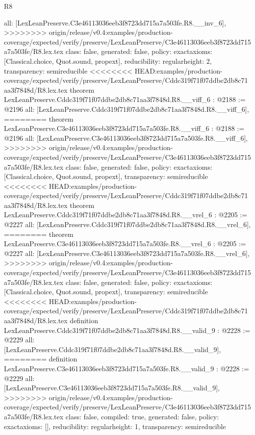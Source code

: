 \begin{lexlean}{R8}
\begin{coremodule}
{{{{{{{{{{{{  all: [LexLeanPreserve.C3e46113036eeb3f8723dd715a7a503fe.R8.__inv_6],
>>>>>>>> origin/release/v0.4:examples/production-coverage/expected/verify/preserve/LexLeanPreserve/C3e46113036eeb3f8723dd715a7a503fe/R8.lex.tex
  class: false,
  generated: false,
  policy: exact{axioms: [Classical.choice, Quot.sound, propext]},
  reducibility: regular{height: 2},
  transparency: semireducible
}
<<<<<<<< HEAD:examples/production-coverage/expected/verify/preserve/LexLeanPreserve/Cddc319f71f07ddbe2db8c71aa3f7848d/R8.lex.tex
theorem LexLeanPreserve.Cddc319f71f07ddbe2db8c71aa3f7848d.R8.__viff_6 : @2188 := @2196 {
  all: [LexLeanPreserve.Cddc319f71f07ddbe2db8c71aa3f7848d.R8.__viff_6],
========
theorem LexLeanPreserve.C3e46113036eeb3f8723dd715a7a503fe.R8.__viff_6 : @2188 := @2196 {
  all: [LexLeanPreserve.C3e46113036eeb3f8723dd715a7a503fe.R8.__viff_6],
>>>>>>>> origin/release/v0.4:examples/production-coverage/expected/verify/preserve/LexLeanPreserve/C3e46113036eeb3f8723dd715a7a503fe/R8.lex.tex
  class: false,
  generated: false,
  policy: exact{axioms: [Classical.choice, Quot.sound, propext]},
  transparency: semireducible
}
<<<<<<<< HEAD:examples/production-coverage/expected/verify/preserve/LexLeanPreserve/Cddc319f71f07ddbe2db8c71aa3f7848d/R8.lex.tex
theorem LexLeanPreserve.Cddc319f71f07ddbe2db8c71aa3f7848d.R8.__vrel_6 : @2205 := @2227 {
  all: [LexLeanPreserve.Cddc319f71f07ddbe2db8c71aa3f7848d.R8.__vrel_6],
========
theorem LexLeanPreserve.C3e46113036eeb3f8723dd715a7a503fe.R8.__vrel_6 : @2205 := @2227 {
  all: [LexLeanPreserve.C3e46113036eeb3f8723dd715a7a503fe.R8.__vrel_6],
>>>>>>>> origin/release/v0.4:examples/production-coverage/expected/verify/preserve/LexLeanPreserve/C3e46113036eeb3f8723dd715a7a503fe/R8.lex.tex
  class: false,
  generated: false,
  policy: exact{axioms: [Classical.choice, Quot.sound, propext]},
  transparency: semireducible
}
<<<<<<<< HEAD:examples/production-coverage/expected/verify/preserve/LexLeanPreserve/Cddc319f71f07ddbe2db8c71aa3f7848d/R8.lex.tex
definition LexLeanPreserve.Cddc319f71f07ddbe2db8c71aa3f7848d.R8.__valid_9 : @2228 := @2229 {
  all: [LexLeanPreserve.Cddc319f71f07ddbe2db8c71aa3f7848d.R8.__valid_9],
========
definition LexLeanPreserve.C3e46113036eeb3f8723dd715a7a503fe.R8.__valid_9 : @2228 := @2229 {
  all: [LexLeanPreserve.C3e46113036eeb3f8723dd715a7a503fe.R8.__valid_9],
>>>>>>>> origin/release/v0.4:examples/production-coverage/expected/verify/preserve/LexLeanPreserve/C3e46113036eeb3f8723dd715a7a503fe/R8.lex.tex
  class: false,
  compiled: true,
  generated: false,
  policy: exact{axioms: []},
  reducibility: regular{height: 1},
  transparency: semireducible
}}}}}}}}}}}}}}}
\end{coremodule}
\end{lexlean}
